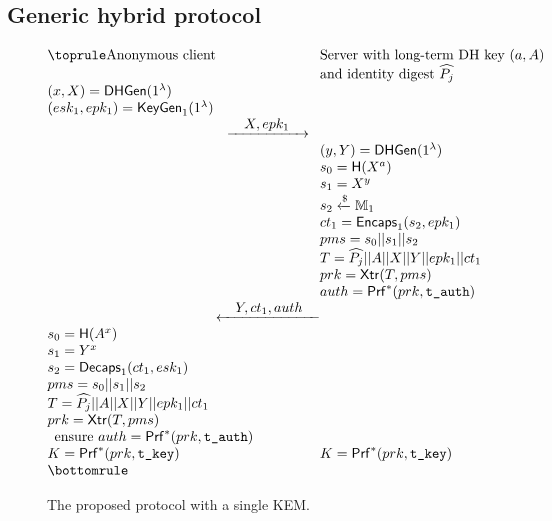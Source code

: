 \documentclass[USenglish,oneside,twocolumn]{article}
\theoremstyle{dgthm}
\theoremstyle{dgdef}
\newcommand{\con}{||}
\newcommand{\samples}{\xleftarrow{\$}}
\newcommand{\AlgorithmName}[1]{\operatorname{\mathsf{#1}}}
\newcommand{\Hash}{\AlgorithmName{H}}
\newcommand{\KeyGen}{\AlgorithmName{KeyGen}}
\newcommand{\Encaps}{\AlgorithmName{Encaps}}
\newcommand{\Decaps}{\AlgorithmName{Decaps}}
\newcommand{\dhgen}{\AlgorithmName{DHGen}}
\newcommand{\PRF}{\AlgorithmName{Prf}}
\newcommand{\XTR}{\AlgorithmName{Xtr}}
\newcommand{\Token}[1]{\textnormal{\tt{#1}}}
\begin{document}
\subsection{Generic hybrid protocol}
  \begin{figure*}[ht]
	  \[
	  \begin{array}{@{}l@{}c@{}l@{}}
	  \toprule
    \text{Anonymous client} && \text{Server with long-term DH key $(a,A)$}\\
    && \text{and identity digest $\widehat{P_j}$}\\
	  (x,X) = \dhgen(1^\lambda) &&\\
	  (esk_1, epk_1) = \KeyGen_1(1^\lambda) &&\\
	  & \xrightarrow{\quad \textstyle X, epk_1 \quad} \\
    && (y,Y) = \dhgen(1^\lambda)\\
	  &&s_0 = \Hash(X^a)\\
    &&s_1 = X^y\\
    &&s_2\samples \mathbb{M}_1 \\
	  &&ct_1 = \Encaps_1(s_2, epk_1)  \\
    &&pms = s_0\con s_1\con s_2\\
    &&T = \widehat{P_j}\con A\con X\con Y\con epk_1\con ct_1 \\
	  && prk = \XTR(T, pms)\\
    && auth = \PRF^*(prk,\Token{t\_auth})\\
	  & \xleftarrow{\textstyle \quad Y, ct_1, auth \quad}\\
	  s_0 = \Hash(A^x) &&\\
    s_1 = Y^x &&\\
    s_2 = \Decaps_1(ct_1, esk_1) && \\
    pms = s_0\con s_1\con s_2&&\\
    T = \widehat{P_j}\con A\con X\con Y\con epk_1\con ct_1&&\\
	  prk = \XTR(T, pms)&&\\
    \multicolumn{2}{l}{{\rm ensure}~auth = \PRF^*(prk,\Token{t\_auth})} &\\
    K = \PRF^*(prk, \Token{t\_key})&& K = \PRF^*(prk, \Token{t\_key})\\
	  \bottomrule
	  \end{array}
	  \]
    \caption{The proposed protocol with a single KEM.}\label{fig:hybrid}
	\end{figure*}
\end{document}
